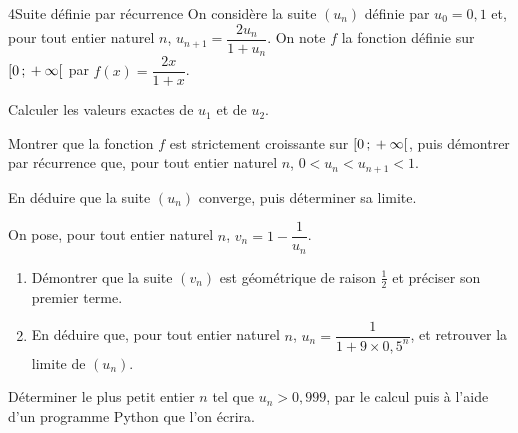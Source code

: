 \begin{exoBac}{4}{Suite définie par récurrence}
On considère la suite $(u_n)$ définie par $u_0=0{,}1$ et, pour tout entier naturel $n$, $u_{n+1}=\dfrac{2u_n}{1+u_n}$. On note $f$ la
fonction définie sur $\mathopen{[}0\,{;}\,+\infty\mathclose{[}$ par $f(x)=\dfrac{2x}{1+x}$.
\begin{questions}
  \item Calculer les valeurs exactes de $u_1$ et de $u_2$.
  \item Montrer que la fonction $f$ est strictement croissante sur $\mathopen{[}0\,{;}\,+\infty\mathclose{[}$, puis démontrer par récurrence que, pour tout
    entier naturel $n$, $0<u_n<u_{n+1}<1$.
  \item En déduire que la suite $(u_n)$ converge, puis déterminer sa limite.
  \item On pose, pour tout entier naturel $n$, $v_n=1-\dfrac{1}{u_n}$.
    \begin{enumerate}[label=\alph*),leftmargin=1.4em,itemsep=0.4mm,topsep=0.4mm]
      \item Démontrer que la suite $(v_n)$ est géométrique de raison $\frac12$ et préciser son premier terme.
      \item En déduire que, pour tout entier naturel $n$, $u_n=\dfrac{1}{1+9\times0{,}5^{n}}$, et retrouver la limite de $(u_n)$.
    \end{enumerate}
  \item Déterminer le plus petit entier $n$ tel que $u_n>0{,}999$, par le calcul puis à l'aide d'un programme Python que l'on écrira.
\end{questions}
\end{exoBac}

